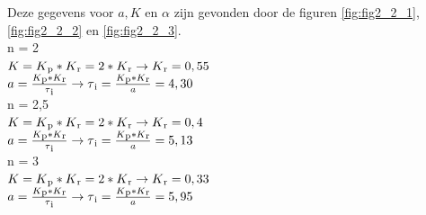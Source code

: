 \documentclass[a4paper, 12pt]{article}
\begin{document}
Deze gegevens voor $a, K$ en $\alpha$ zijn gevonden door de figuren \ref{fig:fig2_2_1}, \ref{fig:fig2_2_2} en \ref{fig:fig2_2_3}. \\ 

n = 2 \\
$K = K\textsubscript{p}*K\textsubscript{r} = 2*K\textsubscript{r} \rightarrow K\textsubscript{r} = 0,55$ \\
$a = \frac{K\textsubscript{p}*K\textsubscript{r}}{\tau\textsubscript{i}} \rightarrow \tau\textsubscript{i} = \frac{K\textsubscript{p}*K\textsubscript{r}}{a} = 4,30$ \\ [3ex]

n = 2,5 \\
$K = K\textsubscript{p}*K\textsubscript{r} = 2*K\textsubscript{r} \rightarrow K\textsubscript{r} = 0,4$ \\
$a = \frac{K\textsubscript{p}*K\textsubscript{r}}{\tau\textsubscript{i}} \rightarrow \tau\textsubscript{i} = \frac{K\textsubscript{p}*K\textsubscript{r}}{a} = 5,13$ \\ [3ex]

n = 3 \\
$K = K\textsubscript{p}*K\textsubscript{r} = 2*K\textsubscript{r} \rightarrow K\textsubscript{r} = 0,33$ \\
$a = \frac{K\textsubscript{p}*K\textsubscript{r}}{\tau\textsubscript{i}} \rightarrow \tau\textsubscript{i} = \frac{K\textsubscript{p}*K\textsubscript{r}}{a} = 5,95$ \\
\end{document}
